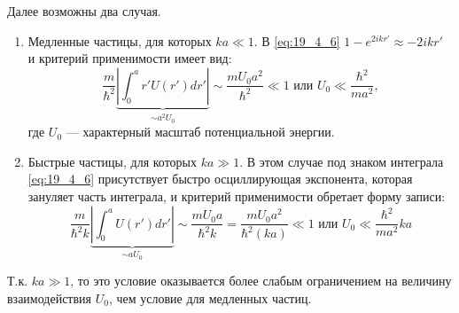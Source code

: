 Далее возможны два случая.

\begin{enumerate}
\item Медленные частицы, для которых $ka \ll 1$. В \eqref{eq:19_4_6} $1-e^{2ik r'} \approx -2ikr'$ и критерий применимости имеет вид:
$$
\frac{m}{\hbar^2} \underbrace{\left| \int_0^a r' U(r') dr' \right|}_{\sim a^2 U_0} \sim \frac{m U_0 a^2}{\hbar^2} \ll 1 \text{ или } \boxed{U_0 \ll \frac{\hbar^2}{ma^2}},
$$
где $U_0$ --- характерный масштаб потенциальной энергии.

\item Быстрые частицы, для которых $ka \gg 1$. В этом случае под знаком интеграла \eqref{eq:19_4_6} присутствует быстро осциллирующая экспонента, которая зануляет часть интеграла, и критерий применимости обретает форму записи:
$$
\frac{m}{\hbar^2 k} \underbrace{\left| \int_0^a U(r') dr'\right |}_{\sim a U_0} \sim \frac{m U_0 a}{\hbar^2 k} = \frac{m U_0 a^2}{\hbar^2 (ka)} \ll 1 \text{ или } \boxed{U_0 \ll \frac{\hbar^2}{ma^2} ka}
$$
\end{enumerate}

Т.к. $ka \gg 1$, то это условие оказывается более слабым ограничением на величину взаимодействия $U_0$, чем условие для медленных частиц.

